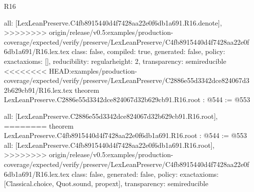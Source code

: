 \begin{lexlean}{R16}
\begin{coremodule}
{{{{{  all: [LexLeanPreserve.C4fb8915440d4f7428aa22e0f6db1a691.R16.denote],
>>>>>>>> origin/release/v0.5:examples/production-coverage/expected/verify/preserve/LexLeanPreserve/C4fb8915440d4f7428aa22e0f6db1a691/R16.lex.tex
  class: false,
  compiled: true,
  generated: false,
  policy: exact{axioms: []},
  reducibility: regular{height: 2},
  transparency: semireducible
}
<<<<<<<< HEAD:examples/production-coverage/expected/verify/preserve/LexLeanPreserve/C2886e55d3342dce824067d32b629cb91/R16.lex.tex
theorem LexLeanPreserve.C2886e55d3342dce824067d32b629cb91.R16.root : @544 := @553 {
  all: [LexLeanPreserve.C2886e55d3342dce824067d32b629cb91.R16.root],
========
theorem LexLeanPreserve.C4fb8915440d4f7428aa22e0f6db1a691.R16.root : @544 := @553 {
  all: [LexLeanPreserve.C4fb8915440d4f7428aa22e0f6db1a691.R16.root],
>>>>>>>> origin/release/v0.5:examples/production-coverage/expected/verify/preserve/LexLeanPreserve/C4fb8915440d4f7428aa22e0f6db1a691/R16.lex.tex
  class: false,
  generated: false,
  policy: exact{axioms: [Classical.choice, Quot.sound, propext]},
  transparency: semireducible
}

}}}}}
\end{coremodule}
\end{lexlean}
